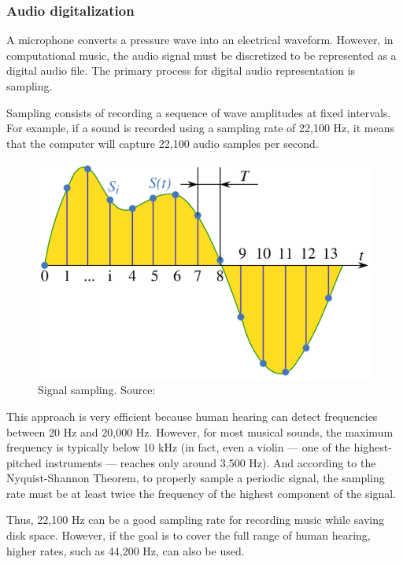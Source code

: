 \documentclass[sigconf,natbib=false]{acmart}
\begin{document}
\subsubsection{Audio digitalization}

A microphone converts a pressure wave into an electrical waveform. However, in computational music, the audio signal must be discretized to be represented as a digital audio file. The primary process for digital audio representation is sampling.

Sampling consists of recording a sequence of wave amplitudes at fixed intervals. For example, if a sound is recorded using a sampling rate of 22,100 Hz, it means that the computer will capture 22,100 audio samples per second.

\begin{figure}[h]
 \centering
 \includegraphics[width=\linewidth]{figs/signal_sampling.png}
 \caption{Signal sampling. Source: \cite{usp:logo}}
\end{figure}

This approach is very efficient because human hearing can detect frequencies between 20 Hz and 20,000 Hz. However, for most musical sounds, the maximum frequency is typically below 10 kHz (in fact, even a violin — one of the highest-pitched instruments — reaches only around 3,500 Hz). And according to the Nyquist-Shannon Theorem, to properly sample a periodic signal, the sampling rate must be at least twice the frequency of the highest component of the signal.

Thus, 22,100 Hz can be a good sampling rate for recording music while saving disk space. However, if the goal is to cover the full range of human hearing, higher rates, such as 44,200 Hz, can also be used.
\end{document}
